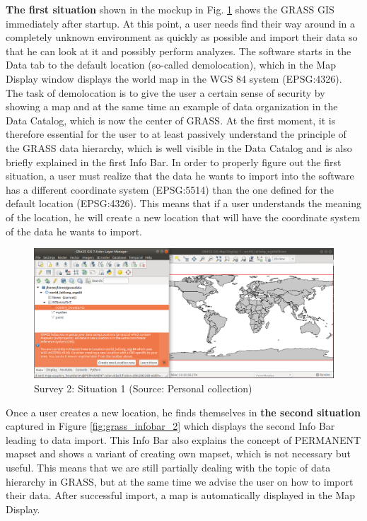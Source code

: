 \documentclass[a4paper,10pt,twoside]{article}
\begin{document}
\textbf{The first situation} shown in the mockup in Fig. \ref{fig:grass_infobar_1} shows the GRASS GIS immediately after startup. At this point, a user needs find their way around in a completely unknown environment as quickly as possible and import their data so that he can look at it and possibly perform analyzes. The software starts in the Data tab to the default location (so-called demolocation), which in the Map Display window displays the world map in the WGS 84 system (EPSG:4326). The task of demolocation is to give the user a certain sense of security by showing a map and at the same time an example of data organization in the Data Catalog, which is now the center of GRASS. At the first moment, it is therefore essential for the user to at least passively understand the principle of the GRASS data hierarchy, which is well visible in the Data Catalog and is also briefly explained in the first Info Bar. In order to properly figure out the first situation, a user must realize that the data he wants to import into the software has a different coordinate system (EPSG:5514) than the one defined for the default location (EPSG:4326). This means that if a user understands the meaning of the location, he will create a new location that will have the coordinate system of the data he wants to import.

\vspace{0.3cm}
\begin{figure}[hbt!] 
\begin{center}
\includegraphics[width=17cm]{../pictures/grass_infobar_1.png} 
\caption[Survey 2: Situation 1]{Survey 2: Situation 1 (Source: Personal collection)}
\label{fig:grass_infobar_1}
\end{center}
\end{figure}

\newpage
\noindent Once a user creates a new location, he finds themselves in \textbf{the second situation} captured in Figure \ref{fig:grass_infobar_2} which displays the second Info Bar leading to data import. This Info Bar also explains the concept of PERMANENT mapset and shows a variant of creating own mapset, which is not necessary but useful. This means that we are still partially dealing with the topic of data hierarchy in GRASS, but at the same time we advise the user on how to import their data. After successful import, a map is automatically displayed in the Map Display.
\end{document}
